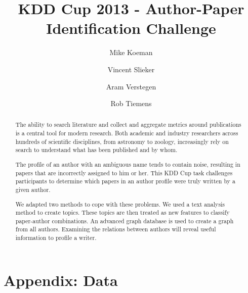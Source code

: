\documentclass[10pt,a4paper]{article}
\title{KDD Cup 2013 - Author-Paper Identification Challenge}
\author{ Mike Koeman \and Vincent Slieker   \and Aram Verstegen \and Rob Tiemens}
\begin{document}
\maketitle


\begin{abstract}
The ability to search literature and collect and aggregate metrics around publications is a central tool for modern research. Both academic and industry researchers across hundreds of scientific disciplines, from astronomy to zoology, increasingly rely on search to understand what has been published and by whom.

The profile of an author with an ambiguous name tends to contain noise, resulting in papers that are incorrectly assigned to him or her. This KDD Cup task challenges participants to determine which papers in an author profile were truly written by a given author.

We adapted two methods to cope with these problems. We used a text analysis method to create topics. These topics are then treated as new features to classify paper-author combinations. An advanced graph database is used to create a graph from all authors. Examining the relations between authors will reveal useful information to profile a writer.
\end{abstract}

\nocite{chowdhury2010introduction}
\nocite{liu2005co}
\nocite{glanzel2005analysing}
\nocite{morel2009co}
\nocite{niels2008writer}
\nocite{steyvers2004probabilistic}
\nocite{newman2004coauthorship}
\nocite{Liu:2006:WDM:1215470}
\nocite{Witten:2005:DMP:1205860}












\appendix
\section{Appendix: Data  \label{sec:data-background}}




\end{document}
